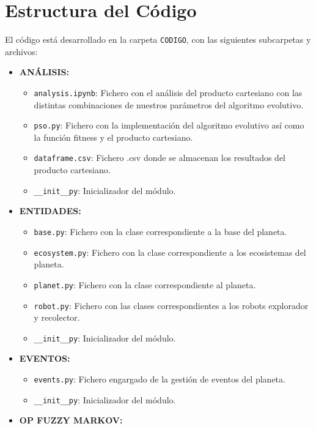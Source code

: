 \documentclass[a4paper,12pt]{article}
\begin{document}
\section{Estructura del Código}
El código está desarrollado en la carpeta \texttt{CODIGO}, con las siguientes subcarpetas y archivos:
\begin{itemize}[label=\textbullet]
    \item \textbf{ANÁLISIS:}
    \begin{itemize}[label=\textendash]
        \item \texttt{analysis.ipynb}: Fichero con el análisis del producto cartesiano con las distintas combinaciones de nuestros parámetros del algoritmo evolutivo.
        \item \texttt{pso.py}: Fichero con la implementación del algoritmo evolutivo así como la función fitness y el producto cartesiano.
        \item \texttt{dataframe.csv}: Fichero .csv donde se almacenan los resultados del producto cartesiano.
        \item \texttt{\_\_init\_\_py}: Inicializador del módulo.
    \end{itemize}
    \item \textbf{ENTIDADES:}
    \begin{itemize}[label=\textendash]
        \item \texttt{base.py}: Fichero con la clase correspondiente a la base del planeta.
        \item \texttt{ecosystem.py}: Fichero con la clase correspondiente a los ecosistemas del planeta.
        \item \texttt{planet.py}: Fichero con la clase correspondiente al planeta.
        \item \texttt{robot.py}: Fichero con las clases correspondientes a los robots explorador y recolector.
        \item \texttt{\_\_init\_\_py}: Inicializador del módulo.
    \end{itemize}
    \item \textbf{EVENTOS:}
    \begin{itemize}[label=\textendash]
        \item \texttt{events.py}: Fichero engargado de la gestión de eventos del planeta.
        \item \texttt{\_\_init\_\_py}: Inicializador del módulo.
    \end{itemize}
    \item \textbf{OP FUZZY MARKOV:}
    \begin{itemize}[label=\textendash]

\end{itemize}
\end{itemize}
\end{document}
